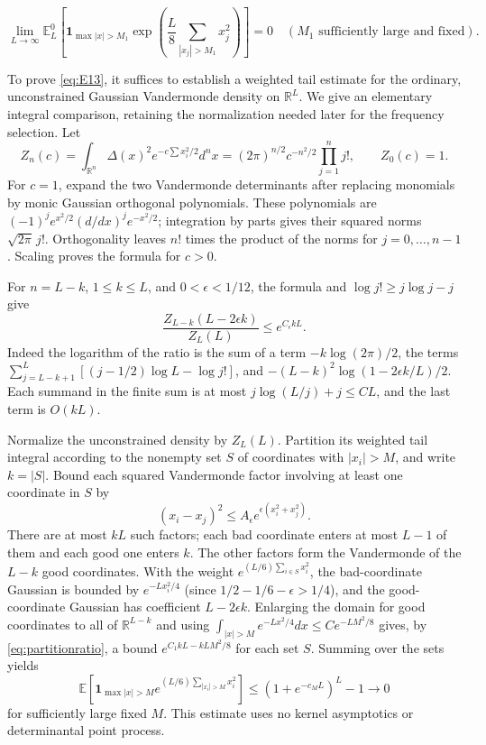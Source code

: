 \documentclass[11pt,a4paper]{article}
\numberwithin{equation}{section}
\theoremstyle{plain}
\theoremstyle{definition}
\begin{document}
\begin{equation}
\lim_{L\to\infty}\mathbb E_L^0\left[\mathbf1_{\max|x|>M_1}\exp\left(\frac L8\sum_{|x_j|>M_1}x_j^2\right)\right]=0\quad(M_1\text{ sufficiently large and fixed}).
\label{eq:E13}
\end{equation}

To prove \eqref{eq:E13}, it suffices to establish a weighted tail estimate for the ordinary, unconstrained Gaussian Vandermonde density on $\mathbb R^L$. We give an elementary integral comparison, retaining the normalization needed later for the frequency selection. Let
\[
Z_n(c)=\int_{\mathbb R^n}\Delta(x)^2e^{-c\sum x_i^2/2}d^nx
=(2\pi)^{n/2}c^{-n^2/2}\prod_{j=1}^n j!,\qquad Z_0(c)=1.
\]
For $c=1$, expand the two Vandermonde determinants after replacing monomials by monic Gaussian orthogonal polynomials. These polynomials are $(-1)^j e^{x^2/2}(d/dx)^j e^{-x^2/2}$; integration by parts gives their squared norms $\sqrt{2\pi}\,j!$. Orthogonality leaves $n!$ times the product of the norms for $j=0,\ldots,n-1$. Scaling proves the formula for $c>0$.

For $n=L-k$, $1\le k\le L$, and $0<\epsilon<1/12$, the formula and $\log j!\ge j\log j-j$ give
\begin{equation}
\frac{Z_{L-k}(L-2\epsilon k)}{Z_L(L)}\le e^{C_\epsilon kL}.\label{eq:partitionratio}
\end{equation}
Indeed the logarithm of the ratio is the sum of a term $-k\log(2\pi)/2$, the terms $\sum_{j=L-k+1}^{L}[(j-1/2)\log L-\log j!]$, and $-(L-k)^2\log(1-2\epsilon k/L)/2$. Each summand in the finite sum is at most $j\log(L/j)+j\le C L$, and the last term is $O(kL)$.

Normalize the unconstrained density by $Z_L(L)$. Partition its weighted tail integral according to the nonempty set $S$ of coordinates with $|x_i|>M$, and write $k=|S|$. Bound each squared Vandermonde factor involving at least one coordinate in $S$ by
\[
(x_i-x_j)^2\le A_\epsilon e^{\epsilon(x_i^2+x_j^2)}.
\]
There are at most $kL$ such factors; each bad coordinate enters at most $L-1$ of them and each good one enters $k$. The other factors form the Vandermonde of the $L-k$ good coordinates. With the weight $e^{(L/6)\sum_{i\in S}x_i^2}$, the bad-coordinate Gaussian is bounded by $e^{-L x_i^2/4}$ (since $1/2-1/6-\epsilon>1/4$), and the good-coordinate Gaussian has coefficient $L-2\epsilon k$. Enlarging the domain for good coordinates to all of $\mathbb R^{L-k}$ and using $\int_{|x|>M}e^{-Lx^2/4}dx\le C e^{-LM^2/8}$ gives, by \eqref{eq:partitionratio}, a bound $e^{C_1 kL-kLM^2/8}$ for each set $S$. Summing over the sets yields
\[
\mathbb E\left[\mathbf1_{\max |x|>M}e^{(L/6)\sum_{|x_i|>M}x_i^2}\right]
\le (1+e^{-c_M L})^L-1\longrightarrow0
\]
for sufficiently large fixed $M$. This estimate uses no kernel asymptotics or determinantal point process.
\end{document}

